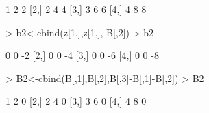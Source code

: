\documentclass[12pt]{article}
\begin{document}
\begin{itemize}
\begin{Schunk}
\begin{Soutput}
     [,1] [,2] [,3]
[1,]    1    2    2
[2,]    2    4    4
[3,]    3    6    6
[4,]    4    8    8
\end{Soutput}
\begin{Sinput}
> b2<-cbind(z[1,],z[1,],-B[,2])
> b2
\end{Sinput}
\begin{Soutput}
     [,1] [,2] [,3]
[1,]    0    0   -2
[2,]    0    0   -4
[3,]    0    0   -6
[4,]    0    0   -8
\end{Soutput}
\begin{Sinput}
> B2<-cbind(B[,1],B[,2],B[,3]-B[,1]-B[,2])
> B2
\end{Sinput}
\begin{Soutput}
     [,1] [,2] [,3]
[1,]    1    2    0
[2,]    2    4    0
[3,]    3    6    0
[4,]    4    8    0
\end{Soutput}
\end{Schunk}


\end{itemize}
\end{document}
